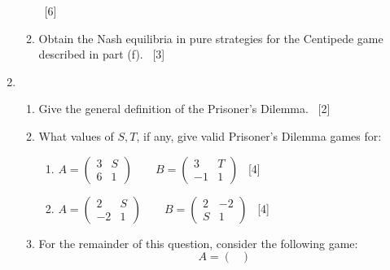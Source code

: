 \documentclass[12pt,a4paper]{article}
\begin{document}
\begin{enumerate}
\begin{enumerate}
            ~\hfill{[6]}


      \item Obtain the Nash equilibria in pure strategies for the Centipede game
          described in part (f). ~\hfill{[3]}

    \end{enumerate}

\newpage
\item

    \begin{enumerate}
        \item Give the general definition of the Prisoner's Dilemma.
            ~\hfill{[2]}
        \item What values of $S, T$, if any, give valid Prisoner's Dilemma games
            for:
            \begin{enumerate}
                \item  \(A =
                         \begin{pmatrix}
                            3 & S\\
                            6 & 1
                         \end{pmatrix}
                         \qquad
                         B =
                         \begin{pmatrix}
                            3 & T\\
                            -1 & 1
                         \end{pmatrix}
                       \)
                ~\hfill{[4]}
                \item  \(A =
                         \begin{pmatrix}
                            2 & S\\
                            -2 & 1
                         \end{pmatrix}
                         \qquad
                         B =
                         \begin{pmatrix}
                            2 & -2\\
                            S & 1
                         \end{pmatrix}
                       \)
                ~\hfill{[4]}
            \end{enumerate}
        \item For the remainder of this question, consider the following game:
            \[A =
                         \begin{pmatrix}

\end{pmatrix}\]
\end{enumerate}
\end{enumerate}
\end{document}
